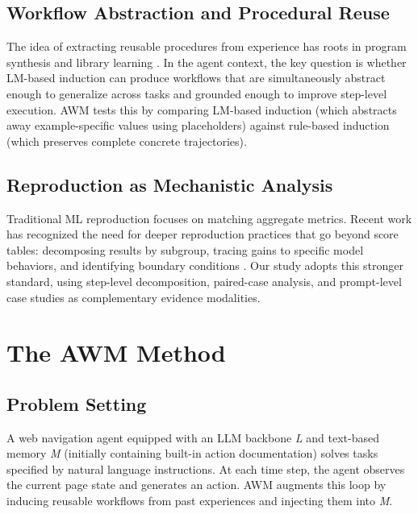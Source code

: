 \documentclass{article}
\begin{document}
\subsection{Workflow Abstraction and Procedural
Reuse}\label{workflow-abstraction-and-procedural-reuse}

The idea of extracting reusable procedures from experience has roots in
program synthesis and library learning
\parencite{ellis2023dreamcoder,grand2023lilo,bowers2023top}. In the
agent context, the key question
is whether LM-based induction can produce workflows that are
simultaneously abstract enough to generalize across tasks and grounded
enough to improve step-level execution. AWM tests this by comparing
LM-based induction (which abstracts away example-specific values using
placeholders) against rule-based induction (which preserves complete
concrete trajectories).

\subsection{Reproduction as Mechanistic
Analysis}\label{reproduction-as-mechanism-audit}

Traditional ML reproduction focuses on matching aggregate metrics.
Recent work has recognized the need for deeper reproduction practices
that go beyond score tables: decomposing results by subgroup, tracing
gains to specific model behaviors, and identifying boundary conditions
\parencite{dodge2019show,bouthillier2019unreproducible}. Our study adopts this
stronger standard, using step-level decomposition, paired-case analysis,
and prompt-level case studies as complementary evidence modalities.

\section{The AWM Method}\label{the-awm-method}

\subsection{Problem Setting}\label{problem-setting}

A web navigation agent equipped with an LLM backbone \emph{L} and
text-based memory \emph{M} (initially containing built-in action
documentation) solves tasks specified by natural language instructions.
At each time step, the agent observes the current page state and
generates an action. AWM augments this loop by inducing reusable
workflows from past experiences and injecting them into \emph{M}.
\end{document}
